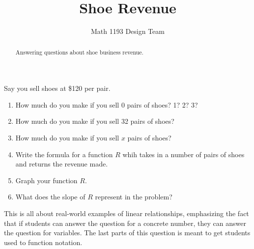 \documentclass[noauthor]{ximera}
\title{Shoe Revenue}
\author{Math 1193 Design Team}
\begin{document}
\begin{abstract}
    Answering questions about shoe business revenue.
\end{abstract}
\maketitle

Say you sell shoes at \$120 per pair.

\begin{enumerate}
    \item How much do you 
    make if you sell 0 pairs of shoes? 1? 2? 3? 
    \item How much do you 
    make if you sell 32 pairs of shoes?
    \item How much do you make if you sell \(x\)
    pairs of shoes?
    \item Write the formula for a function \(R\)
    whih takes in a number of pairs of shoes and
    returns the revenue made.
    \item Graph your function \(R\).
    \item What does the slope of \(R\) represent
    in the problem?
\end{enumerate}

\begin{instructorNotes}
This is all about real-world examples of linear relationships,
emphasizing the fact that if students can answer the question 
for a concrete number, they can answer the question for 
variables. The last parts of this question is meant to 
get students used to function notation. 
\end{instructorNotes}
\end{document}
